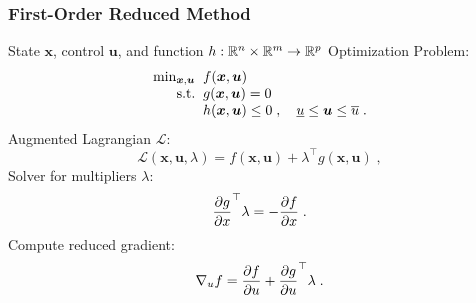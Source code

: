 \begin{frame}
  \frametitle{First-Order Reduced Method}
  State $\bm{x}$, control $\bm{u}$, and function $h: \REAL^{n} \times \REAL^{m} \to \REAL^{p}$
  Optimization Problem:
  \begin{equation*}\label{eq:globalproblem}
    \begin{array}{r@{\;\;}l}
      \min_{\bm{x}, \bm{u}} & f(\bm{x}, \bm{u}) \\
      \text{s.t.} & g(\bm{x}, \bm{u}) = 0 \\
                  & h(\bm{x}, \bm{u}) \leq 0 \;,
                  \quad \underline{u} \leq \bm{u} \leq \overline{u}  \;.
    \end{array}
  \end{equation*}
  Augmented Lagrangian $\mathcal{L}$:
  \begin{equation*}
    \mathcal{L}(\bm{x}, \bm{u}, \lambda) = f(\bm{x}, \bm{u}) + \lambda^\top g(\bm{x}, \bm{u}) \; ,
  \end{equation*}
  Solver for multipliers $\lambda$:
  \begin{equation*}
    \dpart{g}{x}^\top \lambda = -\dpart{f}{x}  \; .
  \end{equation*}
  Compute reduced gradient:
  \begin{equation*}
    \grad{f}{u} = \dpart{f}{u} + \dpart{g}{u}^\top\lambda \; .
  \end{equation*}

\end{frame}


